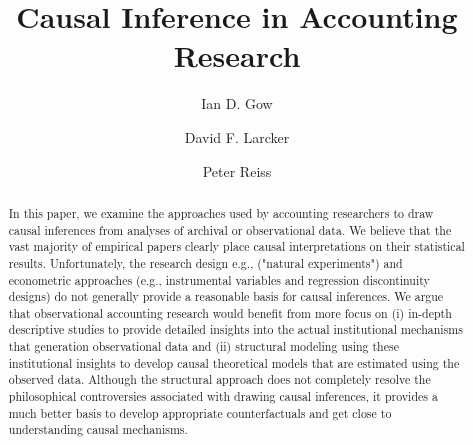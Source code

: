 \documentclass[11pt]{amsart}
\title[Causal Inference]{Causal Inference in Accounting Research}
\author{Ian D. Gow \and David F. Larcker \and Peter Reiss}
\begin{document}
\usetikzlibrary{automata, shapes, calc, positioning}



\maketitle



\begin{abstract}
	In this paper, we examine the approaches used by accounting researchers to draw causal inferences from analyses of archival or observational data. We believe that the vast majority of empirical papers clearly place causal interpretations on their statistical results.
	Unfortunately, the research design e.g., ("natural experiments") and econometric approaches (e.g., instrumental variables and regression discontinuity designs) do not generally provide a reasonable basis for causal inferences.
	We argue that observational accounting research would benefit from more focus on (i) in-depth descriptive studies to provide detailed insights into the actual institutional mechanisms that generation observational data and (ii) structural modeling using these institutional insights to develop causal theoretical models that are estimated using the observed data.  Although the structural approach does not completely resolve the philosophical controversies associated with drawing causal inferences, it provides a much better basis to develop appropriate counterfactuals and get close to understanding causal mechanisms.
\end{abstract}
\end{document}
